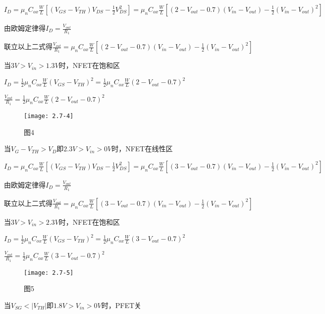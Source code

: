 $I_D=\mu_nC_{ox}\frac{W}{L}[(V_{GS}-V_{TH})V_{DS}-\frac{1}{2}V_{DS}^2]=\mu_nC_{ox}\frac{W}{L}[(2-V_{out}-0.7)(V_{in}-V_{out})-\frac{1}{2}(V_{in}-V_{out})^2]$

由欧姆定律得$I_D=\frac{V_{out}}{R_1}$

联立以上二式得$\frac{V_{out}}{R_1}=\mu_nC_{ox}\frac{W}{L}[(2-V_{out}-0.7)(V_{in}-V_{out})-\frac{1}{2}(V_{in}-V_{out})^2]$

当$3V>V_{in}>1.3V$时，NFET在饱和区

$I_D=\frac{1}{2}\mu_nC_{ox}\frac{W}{L}(V_{GS}-V_{TH})^2=\frac{1}{2}\mu_nC_{ox}\frac{W}{L}(2-V_{out}-0.7)^2$

$\frac{V_{out}}{R_1}=\frac{1}{2}\mu_nC_{ox}\frac{W}{L}(2-V_{out}-0.7)^2$

		\begin{figure}[H] %
	\begin{minipage}{\linewidth}
		\texttt{[image: 2.7-4]}
	\end{minipage}
	\caption*{图4} %
\end{figure}

\scalebox{3}{（c）}

当$V_{G}-V_{TH}>V_{D}$即$2.3V>V_{in}>0V$时，NFET在线性区

$I_D=\mu_nC_{ox}\frac{W}{L}[(V_{GS}-V_{TH})V_{DS}-\frac{1}{2}V_{DS}^2]=\mu_nC_{ox}\frac{W}{L}[(3-V_{out}-0.7)(V_{in}-V_{out})-\frac{1}{2}(V_{in}-V_{out})^2]$

由欧姆定律得$I_D=\frac{V_{out}}{R_1}$

联立以上二式得$\frac{V_{out}}{R_1}=\mu_nC_{ox}\frac{W}{L}[(3-V_{out}-0.7)(V_{in}-V_{out})-\frac{1}{2}(V_{in}-V_{out})^2]$

当$3V>V_{in}>2.3V$时，NFET在饱和区

$I_D=\frac{1}{2}\mu_nC_{ox}\frac{W}{L}(V_{GS}-V_{TH})^2=\frac{1}{2}\mu_nC_{ox}\frac{W}{L}(3-V_{out}-0.7)^2$

$\frac{V_{out}}{R_1}=\frac{1}{2}\mu_nC_{ox}\frac{W}{L}(3-V_{out}-0.7)^2$

\begin{figure}[H] %
	\begin{minipage}{\linewidth}
		\texttt{[image: 2.7-5]}
	\end{minipage}
	\caption*{图5} %
\end{figure}

\scalebox{3}{（d）}

当$V_{SG}<|V_{TH}|$即$1.8V>V_{in}>0V$时，PFET关

